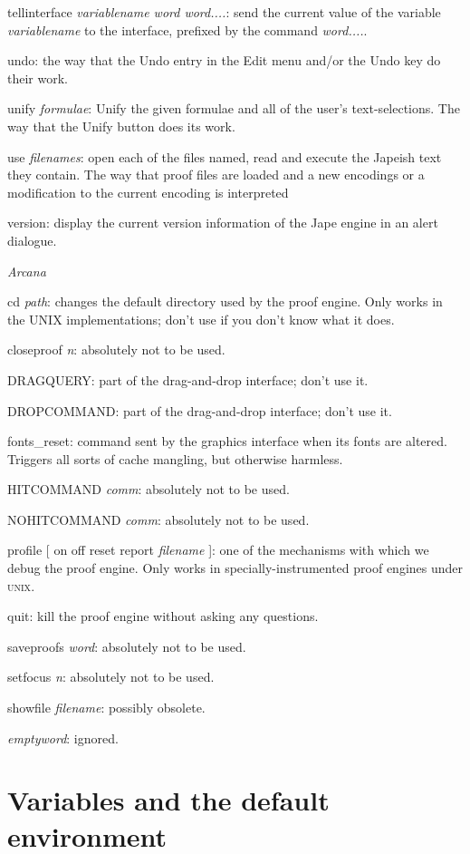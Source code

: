 tellinterface \textit{variablename word word....}: send the current value of the variable \textit{variablename} to the interface, prefixed by the command \textit{word....}.


undo: the way that the Undo entry in the Edit menu and/or the Undo key do their work.


unify \textit{formulae}: Unify the given formulae and all of the user's text-selections. The way that the Unify button does its work.


use \textit{filenames}: open each of the files named, read and execute the Japeish text they contain. The way that proof files are loaded and a new encodings or a modification to the current encoding is interpreted


version: display the current version information of the Jape engine in an alert dialogue.


\textit{Arcana}


cd \textit{path}: changes the default directory used by the proof engine. Only works in the UNIX implementations; don't use if you don't know what it does.


closeproof \textit{n}: absolutely not to be used.

DRAGQUERY: part of the drag-and-drop interface; don't use it.

DROPCOMMAND: part of the drag-and-drop interface; don't use it.


fonts\_reset: command sent by the graphics interface when its fonts are altered. Triggers all sorts of cache mangling, but otherwise harmless.


HITCOMMAND \textit{comm}: absolutely not to be used.

NOHITCOMMAND \textit{comm}: absolutely not to be used.


profile [ on {\textbar} off {\textbar} reset {\textbar} report \textit{filename} ]: one of the mechanisms with which we debug the proof engine. Only works in specially-instrumented proof engines under \textsc{unix}.


quit: kill the proof engine without asking any questions.

saveproofs \textit{word}: absolutely not to be used.

setfocus \textit{n}: absolutely not to be used.

showfile \textit{filename}: possibly obsolete.

\textit{emptyword}: ignored.


\section{Variables and the default environment}


